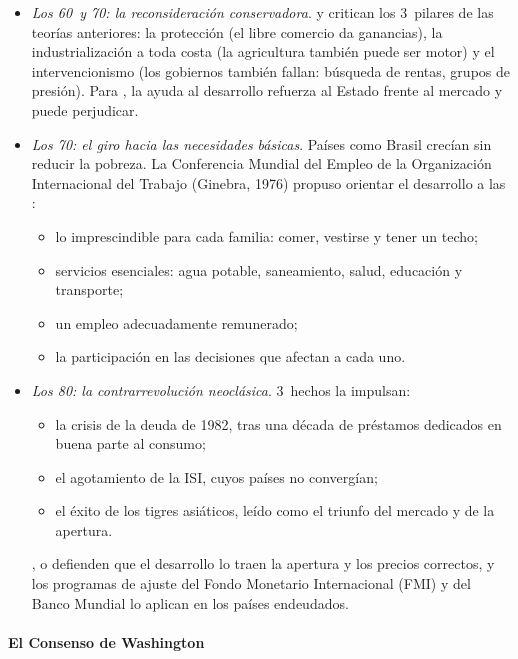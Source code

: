 \documentclass[11pt]{article}
\begin{document}
\begin{itemize}
\item \emph{Los 60~y 70: la reconsideración conservadora}.  y  critican los 3~pilares de las teorías anteriores: la protección (el libre comercio da ganancias), la industrialización a toda costa (la agricultura también puede ser motor) y el intervencionismo (los gobiernos también fallan: búsqueda de rentas, grupos de presión). Para \textcite{Bauer1972}, la ayuda al desarrollo refuerza al Estado frente al mercado y puede perjudicar.
\item \emph{Los 70: el giro hacia las necesidades básicas}. Países como Brasil crecían sin reducir la pobreza. La Conferencia Mundial del Empleo de la Organización Internacional del Trabajo (Ginebra, 1976) propuso orientar el desarrollo a las \nocite{OIT1976NecesidadesBasicas}:
  \begin{itemize}
  \item lo imprescindible para cada familia: comer, vestirse y tener un techo;
  \item servicios esenciales: agua potable, saneamiento, salud, educación y transporte;
  \item un empleo adecuadamente remunerado;
  \item la participación en las decisiones que afectan a cada uno.
  \end{itemize}
\item \emph{Los 80: la contrarrevolución neoclásica}. 3~hechos la impulsan:
  \begin{itemize}
  \item la crisis de la deuda de 1982, tras una década de préstamos dedicados en buena parte al consumo;
  \item el agotamiento de la ISI, cuyos países no convergían;
  \item el éxito de los tigres asiáticos, leído como el triunfo del mercado y de la apertura.
  \end{itemize}
  ,  o  defienden que el desarrollo lo traen la apertura y los precios correctos, y los programas de ajuste del Fondo Monetario Internacional (FMI) y del Banco Mundial lo aplican en los países endeudados.
\end{itemize}

\paragraph{El Consenso de Washington}
\end{document}
